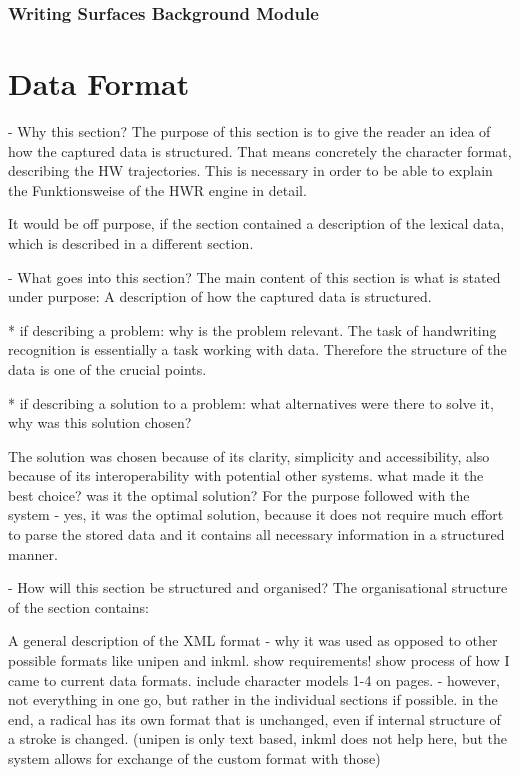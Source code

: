 \subsubsection{Writing Surfaces Background Module}
\label{sec:hwre:writingsurfacebackground}



\section{Data Format}
\label{sec:hwre:dataformat}

- Why this section? 
  The purpose of this section is to give the reader an idea of how the captured
  data is structured. That means concretely the character format, describing
  the HW trajectories. This is necessary in order to be able to explain the
  Funktionsweise of the HWR engine in detail.

  It would be off purpose, if the section contained a description of the 
  lexical data, which is described in a different section.

- What goes into this section?
  The main content of this section is what is stated under purpose:
  A description of how the captured data is structured.

  * if describing a problem: why is the problem relevant.
    The task of handwriting recognition is essentially a task working with data.
    Therefore the structure of the data is one of the crucial points.
    
  * if describing a solution to a problem: what alternatives were
    there to solve it, why was this solution chosen? 

    The solution was chosen because of its clarity, simplicity and 
    accessibility, also because of its interoperability with potential 
    other systems.
    what made it the best choice? was it the optimal solution?
    For the purpose followed with the system - yes, it was the optimal solution,
    because it does not require much effort to parse the stored data
    and it contains all necessary information in a structured manner.
    
- How will this section be structured and organised?
  The organisational structure of the section contains:

  A general description of the XML format - why it was used as opposed to
  other possible formats like unipen and inkml.
  show requirements!
  show process of how I came to current data formats.
  include character models 1-4 on pages. - however, not everything in one go,
  but rather in the individual sections if possible.
  in the end, a radical has its own format that is unchanged, even
  if internal structure of a stroke is changed.
  (unipen is only text based, inkml does not help here, but the system allows
  for exchange of the custom format with those)

